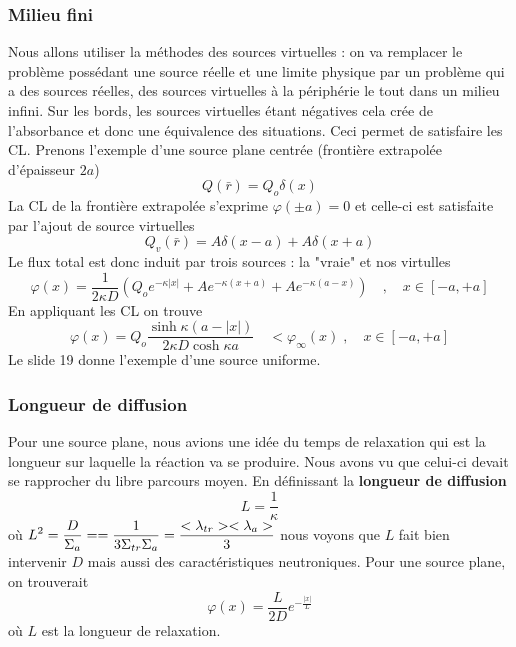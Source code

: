 \subsubsection{Milieu fini}
Nous allons utiliser la méthodes des sources virtuelles : on va remplacer le problème possédant une 
source réelle et une limite physique par un problème qui a des sources réelles, des sources 
virtuelles à la périphérie le tout dans un milieu infini. Sur les bords, les sources virtuelles 
étant négatives cela crée de l'absorbance et donc une équivalence des situations. Ceci permet de 
satisfaire les CL.  Prenons l'exemple d'une source plane centrée (frontière extrapolée d'épaisseur 
$2a$)
\begin{equation}
Q(\bar r) = {Q_o}\delta (x)
\end{equation}
La CL de la frontière extrapolée s'exprime $\varphi ( \pm a) = 0$ et celle-ci est satisfaite par 
l'ajout de source virtuelles
\begin{equation}
{Q_v}(\bar r) = A\delta (x - a) + A\delta (x + a)
\end{equation}
Le flux total est donc induit par trois sources : la "vraie" et nos virtulles
\begin{equation}
\varphi (x) = \frac{1}{{2\kappa D}}({Q_o}{e^{ - \kappa |x|}} + A{e^{ - \kappa (x + a)}} + A{e^{ - \kappa (a - x)}})\quad ,\quad x \in [ - a, + a]
\end{equation}
En appliquant les CL on trouve
\begin{equation}
\varphi (x) = {Q_o}\frac{{\sinh \kappa (a - |x|)}}{{2\kappa D\cosh \kappa a}}\quad  < {\varphi _\infty }(x)\;,\quad x \in [ - a, + a]
\end{equation}
Le slide 19 donne l'exemple d'une source uniforme.




\subsubsection{Longueur de diffusion}
Pour une source plane, nous avions une idée du temps de relaxation qui est la longueur sur laquelle 
la réaction va se produire. Nous avons vu que celui-ci devait se rapprocher du libre parcours moyen. 
En définissant la \textbf{longueur de diffusion}
\begin{equation}
L = \dfrac{1}{\kappa}
\end{equation}
où $\displaystyle {L^2} = \frac{D}{{{\Sigma _a}}} =  = \frac{1}{{3{\Sigma _{tr}}{\Sigma _a}}} = \frac{{ < {\lambda _{tr}} >  < {\lambda _a} > }}{3}$ nous voyons que $L$ fait bien intervenir $D$ mais aussi
des caractéristiques neutroniques.  Pour une source plane, on trouverait
\begin{equation}
\varphi (x) = \frac{L}{{2D}}{e^{ - \frac{{|x|}}{L}}}
\end{equation}
où $L$ est la longueur de relaxation. \\

